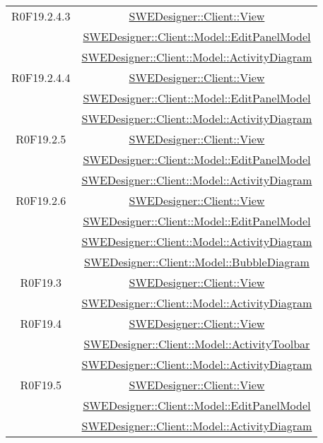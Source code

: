 \documentclass[../SpecificaTecnica.tex]{subfiles}
\begin{document}
\begin{longtable}{|c|c|}
		R0F19.2.4.3 & \hyperlink{SWEDesigner::Client::View}{SWEDesigner::Client::View} \\& \hyperlink{SWEDesigner::Client::Model::EditPanelModel}{SWEDesigner::Client::Model::EditPanelModel} \\& \hyperlink{SWEDesigner::Client::Model::ActivityDiagram}{SWEDesigner::Client::Model::ActivityDiagram} \\\hline
		R0F19.2.4.4 & \hyperlink{SWEDesigner::Client::View}{SWEDesigner::Client::View} \\& \hyperlink{SWEDesigner::Client::Model::EditPanelModel}{SWEDesigner::Client::Model::EditPanelModel} \\& \hyperlink{SWEDesigner::Client::Model::ActivityDiagram}{SWEDesigner::Client::Model::ActivityDiagram} \\\hline
		R0F19.2.5 & \hyperlink{SWEDesigner::Client::View}{SWEDesigner::Client::View} \\& \hyperlink{SWEDesigner::Client::Model::EditPanelModel}{SWEDesigner::Client::Model::EditPanelModel} \\& \hyperlink{SWEDesigner::Client::Model::ActivityDiagram}{SWEDesigner::Client::Model::ActivityDiagram} \\\hline
		R0F19.2.6 & \hyperlink{SWEDesigner::Client::View}{SWEDesigner::Client::View} \\& \hyperlink{SWEDesigner::Client::Model::EditPanelModel}{SWEDesigner::Client::Model::EditPanelModel}  \\& \hyperlink{SWEDesigner::Client::Model::ActivityDiagram}{SWEDesigner::Client::Model::ActivityDiagram} \\& \hyperlink{SWEDesigner::Client::Model::BubbleDiagram}{SWEDesigner::Client::Model::BubbleDiagram}\\\hline
		R0F19.3 & \hyperlink{SWEDesigner::Client::View}{SWEDesigner::Client::View} \\& \hyperlink{SWEDesigner::Client::Model::ActivityDiagram}{SWEDesigner::Client::Model::ActivityDiagram}\\\hline
		R0F19.4 & \hyperlink{SWEDesigner::Client::View}{SWEDesigner::Client::View} \\& \hyperlink{SWEDesigner::Client::Model::ActivityToolbar}{SWEDesigner::Client::Model::ActivityToolbar} \\& \hyperlink{SWEDesigner::Client::Model::ActivityDiagram}{SWEDesigner::Client::Model::ActivityDiagram} \\\hline
		R0F19.5 & \hyperlink{SWEDesigner::Client::View}{SWEDesigner::Client::View} \\& \hyperlink{SWEDesigner::Client::Model::EditPanelModel}{SWEDesigner::Client::Model::EditPanelModel} \\& \hyperlink{SWEDesigner::Client::Model::ActivityDiagram}{SWEDesigner::Client::Model::ActivityDiagram}\\\hline

\end{longtable}
\end{document}

